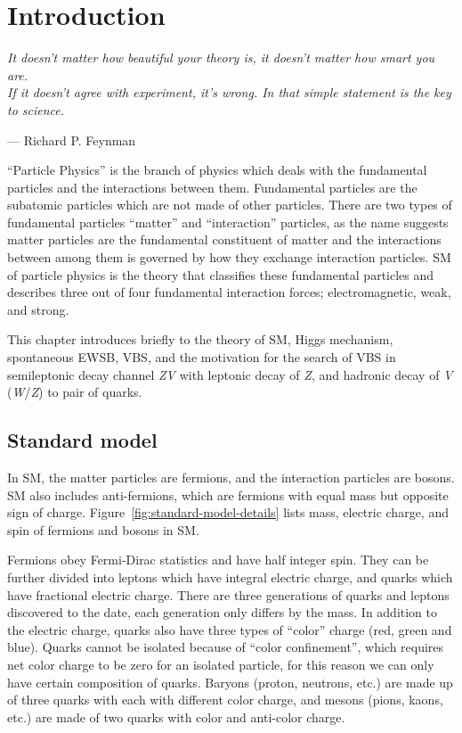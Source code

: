 \chapter{
  Introduction
 }\label{ch_intro}

\epigraph{\textit{It doesn't matter how beautiful your theory is,
    it doesn't matter how smart you are. \\
    If it doesn't agree with experiment, it's wrong.
    In that simple statement is the key to science.}}
{--- Richard P. Feynman}

``Particle Physics'' is the branch of physics which deals with the fundamental
particles and the interactions between them. Fundamental particles are the
subatomic particles which are not made of other particles.
There are two types of fundamental particles ``matter'' and ``interaction''
particles, as the name suggests matter particles are the fundamental constituent of matter and
the interactions between among them is governed by how they exchange interaction particles.
\gls{SM} of particle physics is the theory that classifies these fundamental
particles and describes three out of four fundamental
interaction forces; electromagnetic, weak, and strong.

This chapter introduces briefly to the theory of \gls{SM}, Higgs mechanism,
spontaneous \gls{EWSB}, \gls{VBS}, and the motivation for the search of \gls{VBS}
in semileptonic decay channel \textit{ZV} with leptonic decay of \textit{Z},
and hadronic decay of \textit{V} (\textit{W}/\textit{Z}) to pair of quarks.

\section{
  Standard model
 }\label{ch_intro:standard-model}

In \gls{SM}, the matter particles are fermions, and
the interaction particles are bosons. \gls{SM} also includes
anti-fermions, which are fermions with equal mass but opposite sign of charge.
Figure~\ref{fig:standard-model-details} lists mass, electric charge,
and spin of fermions and bosons in \gls{SM}.

Fermions obey Fermi-Dirac statistics and have half integer spin. They can be further
divided into leptons which have integral electric charge, and quarks which have
fractional electric charge. There are three generations of quarks and leptons
discovered to the date, each generation only differs by the mass.
In addition to the electric charge, quarks also have
three types of ``color'' charge (red, green and blue). Quarks cannot be isolated
because of ``color confinement'', which requires net color charge to be zero
for an isolated particle, for this reason we can only have certain composition
of quarks. Baryons (proton, neutrons, etc.) are made up of three quarks with
each with different color charge,
and mesons (pions, kaons, etc.) are made of two quarks with color and anti-color charge.

